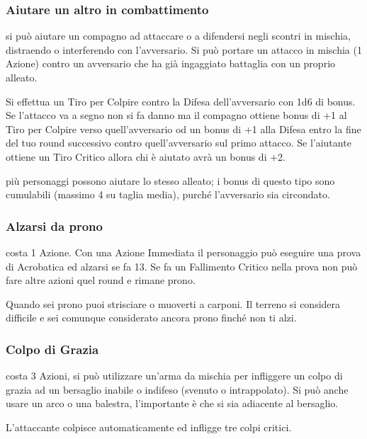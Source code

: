 \begin{multicols}{2}
\subsubsection{Aiutare un altro in combattimento}\label{aiutare}\hypertarget{aiutare}{}

si può aiutare un compagno ad attaccare o a difendersi negli scontri in mischia, distraendo o interferendo con l'avversario. Si può portare un attacco in mischia (1 Azione) contro un avversario che ha già ingaggiato battaglia con un proprio alleato.

Si effettua un Tiro per Colpire contro la Difesa dell'avversario con 1d6 di bonus. Se l'attacco va a segno non si fa danno ma il compagno ottiene bonus di +1 al Tiro per Colpire verso quell'avversario od un bonus di +1 alla Difesa entro la fine del tuo round successivo contro quell'avversario sul primo attacco. Se l'aiutante ottiene un Tiro Critico allora chi è aiutato avrà un bonus di +2.

più personaggi possono aiutare lo stesso alleato; i bonus di questo tipo sono cumulabili (massimo 4 su taglia media), purché l'avversario sia circondato.

\subsubsection{Alzarsi da prono}\label{alzarsidaprono}\hypertarget{alzarsidaprono}{}

costa 1 Azione. Con una Azione Immediata il personaggio può eseguire una prova di Acrobatica ed alzarsi se fa 13. Se fa un Fallimento Critico nella prova non può fare altre azioni quel round e rimane prono.

Quando sei prono puoi strisciare o muoverti a carponi. Il terreno si considera difficile e sei comunque considerato ancora prono finché non ti alzi.

\subsubsection{Colpo di Grazia} \label{colpodigrazia}

costa 3 Azioni, si può utilizzare un'arma da mischia per infliggere un colpo di grazia ad un bersaglio inabile o indifeso (svenuto o intrappolato). Si può anche usare un arco o una balestra, l'importante è che si sia adiacente al bersaglio.

L'attaccante colpisce automaticamente ed infligge tre colpi critici.


\end{multicols}
